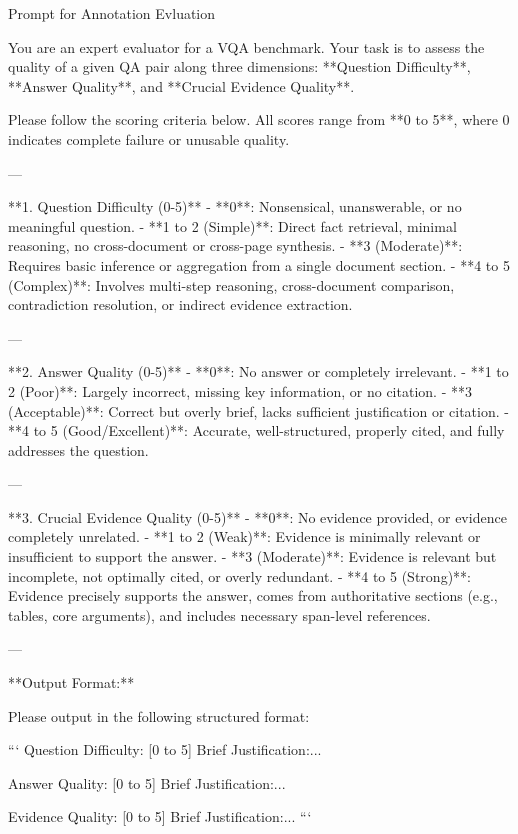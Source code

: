 \documentclass[]{opendatalab}
\begin{document}
{{{\begin{promptbox}[breakable]{Prompt for Annotation Evluation}

You are an expert evaluator for a VQA benchmark. Your task is to assess the quality of a given QA pair along three dimensions: **Question Difficulty**, **Answer Quality**, and **Crucial Evidence Quality**.

Please follow the scoring criteria below. All scores range from **0 to 5**, where 0 indicates complete failure or unusable quality.

---

**1. Question Difficulty (0-5)**
- **0**: Nonsensical, unanswerable, or no meaningful question.
- **1 to 2 (Simple)**: Direct fact retrieval, minimal reasoning, no cross-document or cross-page synthesis.
- **3 (Moderate)**: Requires basic inference or aggregation from a single document section.
- **4 to 5 (Complex)**: Involves multi-step reasoning, cross-document comparison, contradiction resolution, or indirect evidence extraction.

---

**2. Answer Quality (0-5)**
- **0**: No answer or completely irrelevant.
- **1 to 2 (Poor)**: Largely incorrect, missing key information, or no citation.
- **3 (Acceptable)**: Correct but overly brief, lacks sufficient justification or citation.
- **4 to 5 (Good/Excellent)**: Accurate, well-structured, properly cited, and fully addresses the question.

---

**3. Crucial Evidence Quality (0-5)**
- **0**: No evidence provided, or evidence completely unrelated.
- **1 to 2 (Weak)**: Evidence is minimally relevant or insufficient to support the answer.
- **3 (Moderate)**: Evidence is relevant but incomplete, not optimally cited, or overly redundant.
- **4 to 5 (Strong)**: Evidence precisely supports the answer, comes from authoritative sections (e.g., tables, core arguments), and includes necessary span-level references.

---

**Output Format:**

Please output in the following structured format:

```
Question Difficulty: [0 to 5]
Brief Justification:...

Answer Quality: [0 to 5]
Brief Justification:...

Evidence Quality: [0 to 5]
Brief Justification:...
```
\end{promptbox}


}}}
\end{document}
